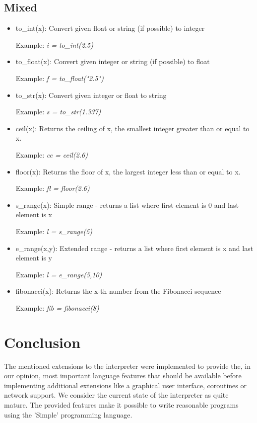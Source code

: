 \documentclass{article}
\begin{document}
\subsection{Mixed}
\begin{itemize}
\item to\_int(x): Convert given float or string (if possible) to integer

Example: \textit{i = to\_int(2.5)}

\item to\_float(x): Convert given integer or string (if possible) to float

Example: \textit{f = to\_float("2.5")}

\item to\_str(x): Convert given integer or float to string

Example: \textit{s = to\_str(1.337)}

\item ceil(x): Returns the ceiling of x, the smallest integer greater than or equal to x.

Example: \textit{ce = ceil(2.6)}

\item floor(x): Returns the floor of x, the largest integer less than or equal to x.

Example: \textit{fl = floor(2.6)}

\item s\_range(x): Simple range - returns a list where first element is 0 and last element is x

Example: \textit{l = s\_range(5)}

\item e\_range(x,y): Extended range - returns a list where first element is x and last element is y

Example: \textit{l = e\_range(5,10)}

\item fibonacci(x): Returns the x-th number from the Fibonacci sequence

Example: \textit{fib = fibonacci(8)}
\end{itemize}



\section{Conclusion}
The mentioned extensions to the interpreter were implemented to provide the, in our opinion, most important language features that should be available before implementing additional extensions like a graphical user interface, coroutines or network support. We consider the current state of the interpreter as quite mature. The provided features make it possible to write reasonable programs using the 'Simple' programming language.


\newpage
\end{document}
